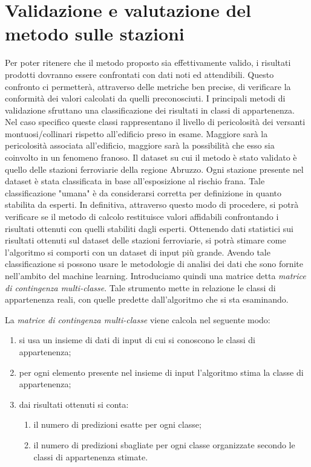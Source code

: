 
\chapter{Validazione e valutazione del metodo sulle stazioni} %
Per poter ritenere che il metodo proposto sia effettivamente valido, i risultati prodotti dovranno essere confrontati con dati noti ed attendibili. Questo confronto ci permetterà, attraverso delle metriche ben precise, di verificare la conformità dei valori calcolati da quelli preconosciuti.
I principali metodi di validazione sfruttano una classificazione dei risultati in classi di appartenenza. Nel caso specifico queste classi rappresentano il livello di pericolosità dei versanti montuosi/collinari rispetto all'edificio preso in esame.
Maggiore sarà la pericolosità associata all'edificio, maggiore sarà la possibilità che esso sia coinvolto in un fenomeno franoso.
Il dataset su cui il metodo è stato validato è quello delle stazioni ferroviarie della regione Abruzzo.
Ogni stazione presente nel dataset è stata classificata in base all'esposizione al rischio frana. Tale classificazione "umana" è da considerarsi corretta per definizione in quanto stabilita da esperti. In definitiva, attraverso questo modo di procedere, si potrà verificare se il metodo di calcolo restituisce valori affidabili confrontando i risultati ottenuti con quelli stabiliti dagli esperti. Ottenendo dati statistici sui risultati ottenuti sul dataset delle stazioni ferroviarie, si potrà stimare come l'algoritmo si comporti con un dataset di input più grande. 
Avendo tale classificazione si possono usare le metodologie di analisi dei dati che sono fornite nell'ambito del machine learning. Introduciamo quindi una matrice detta \textit{matrice di contingenza multi-classe}. Tale strumento mette in relazione le classi di appartenenza reali, con quelle predette dall'algoritmo che si sta esaminando.


La \textit{matrice di contingenza multi-classe} viene calcola nel seguente modo:
\begin{enumerate}
	\item si usa un insieme di dati di input di cui si conoscono le classi di appartenenza;
	\item per ogni elemento presente nel insieme di input l'algoritmo stima la classe di appartenenza;
	\item dai risultati ottenuti si conta:
	\begin{enumerate}
		\item il numero di predizioni esatte per ogni classe;
		\item il numero di predizioni sbagliate per ogni classe organizzate secondo le classi di appartenenza stimate.
	\end{enumerate}
\end{enumerate}




